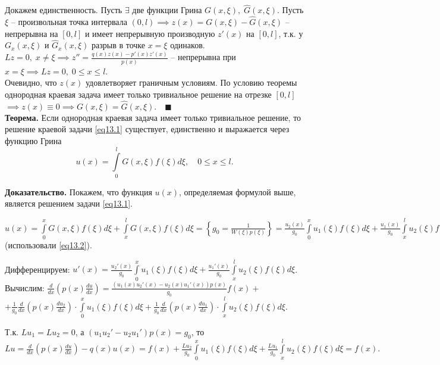 Докажем единственность. Пусть $\exists$ две функции Грина $G(x, \xi),\; \widehat{G}(x, \xi)$. Пусть $\xi$ -- произвольная точка интервала $(0,l) \implies z(x) = G(x, \xi) - \widehat{G}(x, \xi)$ -- непрерывна на $[0,l]$ и имеет непрерывную производную $z'(x)$ на $[0,l]$, т.к. у $G_x(x, \xi)$ и $\widehat{G}_x(x, \xi)$ разрыв в точке $x = \xi$ одинаков.\\

$Lz = 0, \; x \ne \xi \implies z'' = \frac{q(x) z(x) - p'(x) z'(x)}{p(x)}$ -- непрерывна при $x = \xi \implies Lz = 0, \; 0 \leq x \leq l$.\\

Очевидно, что $z(x)$ удовлетворяет граничным условиям. По условию теоремы однородная краевая задача имеет только тривиальное решение на отрезке $[0, l]$ $\implies z(x) \equiv 0 \implies G(x, \xi) = \widehat{G}(x, \xi). \quad \blacksquare$\\

\textbf{Теорема.} Если однородная краевая задача имеет только тривиальное решение, то решение краевой задачи \eqref{eq13.1} существует, единственно и выражается через функцию Грина $$u(x) = \int\limits_0^l G(x, \xi) f(\xi) d\xi, \quad 0 \leq x \leq l.$$

\textbf{Доказательство.} Покажем, что функция $u(x)$, определяемая формулой выше, является решением задачи \eqref{eq13.1}.

$u(x) = \int\limits_0^x G(x, \xi) f(\xi) d\xi + \int\limits_x^l G(x, \xi) f(\xi) d\xi = \left \{ g_0 = \frac{1}{W(\xi) p(\xi)} \right \} = \frac{u_2(x)}{g_0} \int\limits_0^x u_1(\xi) f(\xi) d\xi + \frac{u_1(x)}{g_0} \int\limits_x^l u_2(\xi) f(\xi) d\xi \quad$ (использовали \eqref{eq13.2}).

Дифференцируем: $u'(x) = \frac{u_2'(x)}{g_0} \int\limits_0^x u_1(\xi) f(\xi) d\xi + \frac{u_1'(x)}{g_0} \int\limits_x^l u_2(\xi) f(\xi) d\xi$.\\[2mm]

Вычислим: $\frac{d}{dx} \left ( p(x) \frac{du}{dx} \right ) = \frac{(u_1(x) u_2'(x) - u_2(x) u_1'(x)) p(x)}{g_0} f(x) +$ \\$+ \frac{1}{g_0} \frac{d}{dx} \left ( p(x) \frac{du_2}{dx} \right ) \cdot \int\limits_0^x u_1(\xi) f(\xi) d\xi + \frac{1}{g_0} \frac{d}{dx} \left ( p(x) \frac{du_1}{dx} \right ) \cdot \int\limits_x^l u_2(\xi) f(\xi) d\xi$.

Т.к. $Lu_1 = Lu_2 = 0$, а $(u_1 u_2' - u_2 u_1') p(x) = g_0$, то $Lu = \frac{d}{dx} \left ( p(x) \frac{du}{dx} \right ) - q(x) u(x) = f(x) + \frac{Lu_2}{g_0} \int\limits_0^x u_1(\xi) f(\xi) d\xi + \frac{Lu_1}{g_0} \int\limits_x^l u_2(\xi) f(\xi) d\xi = f(x).$\\

